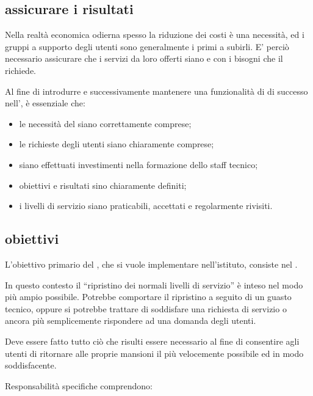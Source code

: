 \subsection[Assicurare i risultati]{assicurare i risultati}
\label{sd-introduction-ensuring-results}
Nella realtà economica odierna spesso la riduzione dei costi è una necessità, ed i gruppi a supporto degli utenti sono generalmente i primi a subirli. E' perciò necessario assicurare che i servizi da loro offerti siano  e  con i bisogni che il  richiede.

Al fine di introdurre e successivamente mantenere una funzionalità di  di successo nell'\entity{}, è essenziale che:

\begin{itemize}
\item{le necessità del  siano correttamente comprese;}
\item{le richieste degli utenti siano chiaramente comprese;}
\item{siano effettuati investimenti nella formazione dello staff tecnico;}
\item{obiettivi e risultati sino chiaramente definiti;}
\item{i livelli di servizio siano praticabili, accettati e regolarmente rivisiti.}
\end{itemize}

\subsection[Obiettivi]{obiettivi}
\label{sd-introduction-objectives}
L'obiettivo primario del , che si vuole implementare nell'istituto, consiste nel .

In questo contesto il ``ripristino dei normali livelli di servizio'' è inteso nel modo più ampio possibile. Potrebbe comportare il ripristino a seguito di un guasto tecnico, oppure si potrebbe trattare di soddisfare una richiesta di servizio o ancora più semplicemente rispondere ad una domanda degli utenti. 

Deve essere fatto tutto ciò che risulti essere necessario al fine di consentire agli utenti di ritornare alle proprie mansioni il più velocemente possibile ed in modo soddisfacente.

Responsabilità specifiche comprendono:

